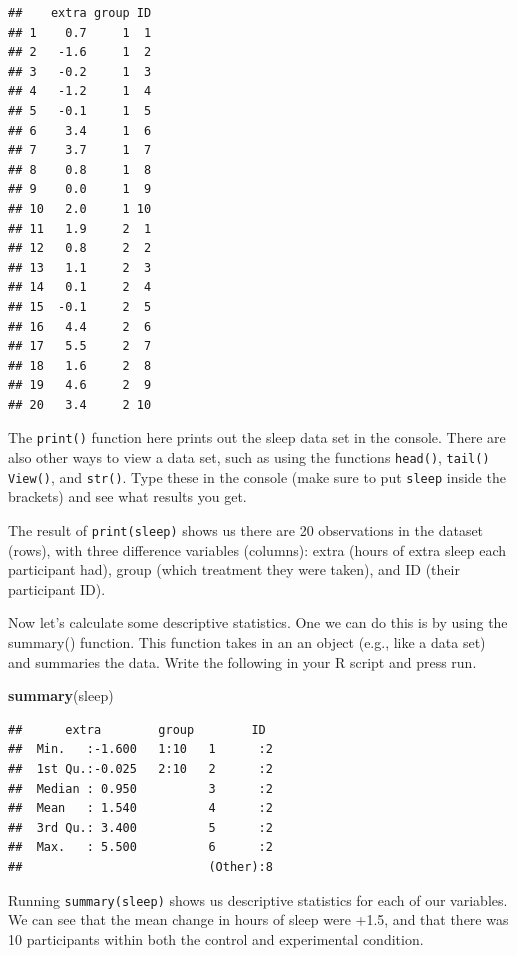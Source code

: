 \documentclass[
]{book}
\newenvironment{Shaded}{\begin{snugshade}}{\end{snugshade}}
\newcommand{\FunctionTok}[1]{\textcolor[rgb]{0.13,0.29,0.53}{\textbf{#1}}}
\newcommand{\NormalTok}[1]{#1}
\begin{document}
\begin{verbatim}
##    extra group ID
## 1    0.7     1  1
## 2   -1.6     1  2
## 3   -0.2     1  3
## 4   -1.2     1  4
## 5   -0.1     1  5
## 6    3.4     1  6
## 7    3.7     1  7
## 8    0.8     1  8
## 9    0.0     1  9
## 10   2.0     1 10
## 11   1.9     2  1
## 12   0.8     2  2
## 13   1.1     2  3
## 14   0.1     2  4
## 15  -0.1     2  5
## 16   4.4     2  6
## 17   5.5     2  7
## 18   1.6     2  8
## 19   4.6     2  9
## 20   3.4     2 10
\end{verbatim}

The \texttt{print()} function here prints out the sleep data set in the console. There are also other ways to view a data set, such as using the functions \texttt{head()}, \texttt{tail()} \texttt{View()}, and \texttt{str()}. Type these in the console (make sure to put \texttt{sleep} inside the brackets) and see what results you get.

The result of \texttt{print(sleep)} shows us there are 20 observations in the dataset (rows), with three difference variables (columns): extra (hours of extra sleep each participant had), group (which treatment they were taken), and ID (their participant ID).

Now let's calculate some descriptive statistics. One we can do this is by using the summary() function. This function takes in an an object (e.g., like a data set) and summaries the data. Write the following in your R script and press run.

\begin{Shaded}
\begin{Highlighting}[]
\FunctionTok{summary}\NormalTok{(sleep) }
\end{Highlighting}
\end{Shaded}

\begin{verbatim}
##      extra        group        ID   
##  Min.   :-1.600   1:10   1      :2  
##  1st Qu.:-0.025   2:10   2      :2  
##  Median : 0.950          3      :2  
##  Mean   : 1.540          4      :2  
##  3rd Qu.: 3.400          5      :2  
##  Max.   : 5.500          6      :2  
##                          (Other):8
\end{verbatim}

Running \texttt{summary(sleep)} shows us descriptive statistics for each of our variables. We can see that the mean change in hours of sleep were +1.5, and that there was 10 participants within both the control and experimental condition.
\end{document}
